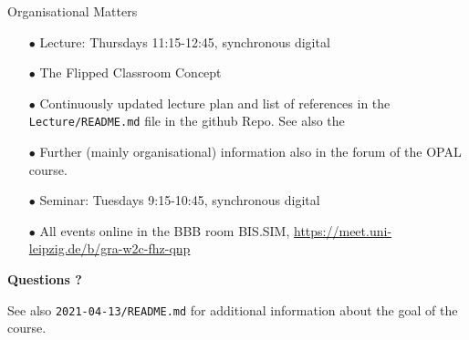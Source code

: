 \documentclass{beamer}
\begin{document}
\begin{frame}{Organisational Matters}

\begin{itemize}
\item[$\bullet$] Lecture: Thursdays 11:15-12:45, synchronous digital
\item[$\bullet$] The Flipped Classroom Concept
\item[$\bullet$] Continuously updated lecture plan and list of references in
  the \texttt{Lecture/README.md} file in the github Repo.  See also the
\item[$\bullet$] Further (mainly organisational) information also in the forum
  of the OPAL course.
\item[$\bullet$] Seminar: Tuesdays 9:15-10:45, synchronous digital
\item[$\bullet$] All events online in the BBB room BIS.SIM,
  \url{https://meet.uni-leipzig.de/b/gra-w2c-fhz-qnp}
\end{itemize}
\begin{center}\LARGE\bf
  Questions ?
\end{center}

See also \texttt{2021-04-13/README.md} for additional information about the
goal of the course. 

\end{frame}
\end{document}
